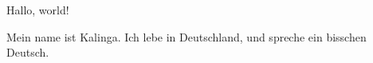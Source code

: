 \documentclass{article}
\begin{document}
    Hallo, world!
    
    Mein name ist Kalinga.
    Ich lebe in Deutschland, und spreche ein bisschen Deutsch.
    
\end{document}
